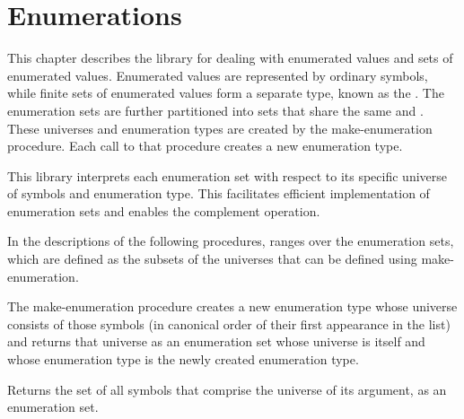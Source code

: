 \chapter{Enumerations}
\label{enumerationschapter}

This chapter describes the  library for dealing with enumerated values
and sets of enumerated values.  Enumerated
values are represented by ordinary symbols, while finite sets of
enumerated values form a separate type, known as the
.
The enumeration sets are further partitioned into sets that
share the same  and .
These universes and enumeration types are created by the
{\cf make-enumeration} procedure.  Each call to that procedure
creates a new enumeration type.

This library interprets each enumeration set with respect to
its specific universe of symbols and enumeration type.
This facilitates efficient implementation of enumeration sets
and enables the complement operation.

In the descriptions of the following procedures, 
ranges over the enumeration sets, which are defined as the subsets
of the universes that can be defined using {\cf make-enumeration}.

\begin{entry}{%
}

The {\cf make-enumeration} procedure
creates a new enumeration type whose universe consists of
those symbols (in canonical order of their first appearance
in the list) and returns that universe as an enumeration
set whose universe is itself and whose enumeration type is
the newly created enumeration type.
\end{entry}

\begin{entry}{%
}

Returns the set of all symbols that comprise
the universe of its argument, as an enumeration set.
\end{entry}


